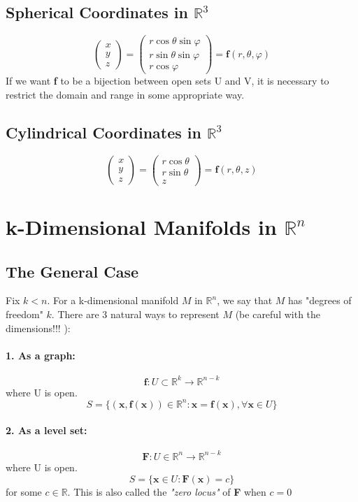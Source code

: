 \documentclass[11pt]{article}
\newcommand{\ti}[1]{\textit{#1}}
\newcommand{\tb}[1]{\textbf{#1}}
\newcommand{\real}[0]{\mathbb{R}}
\newcommand{\func}[3]{\tb{#1}: {#2} \rightarrow {#3} }
\begin{document}
\subsection{Spherical Coordinates in $\real^3$}
$$\begin{pmatrix}
    x\\y\\z
\end{pmatrix}
= \begin{pmatrix}
    r\cos{\theta}\sin{\varphi}\\
    r\sin{\theta}\sin{\varphi}\\
    r\cos{\varphi}
\end{pmatrix}
= \tb{f}(r, \theta, \varphi)$$
If we want \tb{f} to be a bijection between open sets U and V, it is necessary to restrict the domain and range in some appropriate way.

\subsection{Cylindrical Coordinates in $\real^3$}
$$\begin{pmatrix}
    x\\y\\z
\end{pmatrix}
= \begin{pmatrix}
    r\cos{\theta}\\
    r\sin{\theta}\\
    z
\end{pmatrix}
= \tb{f}(r, \theta, z)$$

\section{k-Dimensional Manifolds in $\real^n$}
\subsection{The General Case}
Fix $k < n$. For a k-dimensional manifold $M$ in $\real^n$, we say that $M$ has "degrees of freedom" $k$. There are 3 natural ways to represent $M$ (be careful with the dimensions!!! ):
\paragraph{1. As a \tb{graph}:}
        $$\func{f}{U \subset \real^k}{\real^{n-k}}$$ where U is open.
        $$ S = \{(\tb{x}, \tb{f}(\tb{x})) \in \real^n: \tb{x} = \tb{f}(\tb{x}), \forall \tb{x} \in U \}$$
\paragraph{2. As a \tb{level set}:}
    $$ \func{F}{U\in \real^n}{\real^{n-k}}$$ where U is open.
    $$ S = \{\tb{x} \in U: \tb{F}(\tb{x}) = c\}$$ for some $c \in \real$.\newline
    This is also called the \ti{"zero locus"} of \tb{F} when $c = 0$
\end{document}
